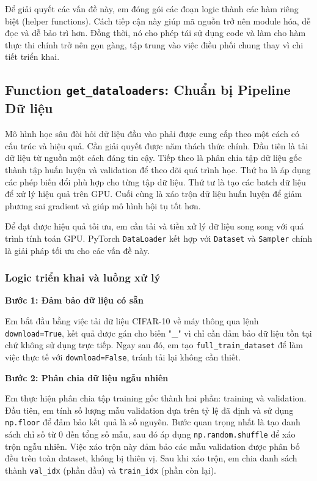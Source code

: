 \documentclass[12pt, a4paper, openany]{report}
\begin{document}
Để giải quyết các vấn đề này, em đóng gói các đoạn logic thành các hàm riêng biệt (helper functions). Cách tiếp cận này giúp mã nguồn trở nên module hóa, dễ đọc và dễ bảo trì hơn. Đồng thời, nó cho phép tái sử dụng code và làm cho hàm thực thi chính trở nên gọn gàng, tập trung vào việc điều phối chung thay vì chi tiết triển khai.

\subsection{Function \texttt{get\_dataloaders}: Chuẩn bị Pipeline Dữ liệu}
Mô hình học sâu đòi hỏi dữ liệu đầu vào phải được cung cấp theo một cách có cấu trúc và hiệu quả. Cần giải quyết được năm thách thức chính. Đầu tiên là tải dữ liệu từ nguồn một cách đáng tin cậy. Tiếp theo là phân chia tập dữ liệu gốc thành tập huấn luyện và validation để theo dõi quá trình học. Thứ ba là áp dụng các phép biến đổi phù hợp cho từng tập dữ liệu. Thứ tư là tạo các batch dữ liệu để xử lý hiệu quả trên GPU. Cuối cùng là xáo trộn dữ liệu huấn luyện để giảm phương sai gradient và giúp mô hình hội tụ tốt hơn.

Để đạt được hiệu quả tối ưu, em cần tải và tiền xử lý dữ liệu song song với quá trình tính toán GPU. PyTorch \texttt{DataLoader} kết hợp với \texttt{Dataset} và \texttt{Sampler} chính là giải pháp tối ưu cho các vấn đề này.

\subsubsection*{Logic triển khai và luồng xử lý}
\noindent\textbf{Bước 1: Đảm bảo dữ liệu có sẵn}

Em bắt đầu bằng việc tải dữ liệu CIFAR-10 về máy thông qua lệnh \texttt{download=True}, kết quả được gán cho biến "\_" vì chỉ cần đảm bảo dữ liệu tồn tại chứ không sử dụng trực tiếp. Ngay sau đó, em tạo \texttt{full\_train\_dataset} để làm việc thực tế với \texttt{download=False}, tránh tải lại không cần thiết.

\noindent\textbf{Bước 2: Phân chia dữ liệu ngẫu nhiên} 

Em thực hiện phân chia tập training gốc thành hai phần: training và validation. Đầu tiên, em tính số lượng mẫu validation dựa trên tỷ lệ đã định và sử dụng \texttt{np.floor} để đảm bảo kết quả là số nguyên.
Bước quan trọng nhất là tạo danh sách chỉ số từ 0 đến tổng số mẫu, sau đó áp dụng \texttt{np.random.shuffle} để xáo trộn ngẫu nhiên. Việc xáo trộn này đảm bảo các mẫu validation được phân bố đều trên toàn dataset, không bị thiên vị. Sau khi xáo trộn, em chia danh sách thành \texttt{val\_idx} (phần đầu) và \texttt{train\_idx} (phần còn lại).
\end{document}
